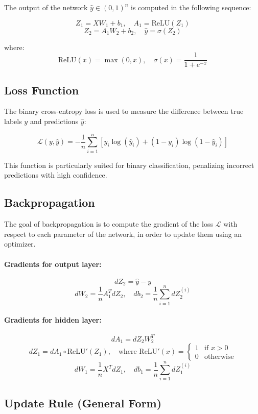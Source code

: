 \documentclass[12pt]{article}
\begin{document}
The output of the network $\hat{y} \in (0,1)^n$ is computed in the following sequence:

\[
Z_1 = X W_1 + b_1, \quad A_1 = \text{ReLU}(Z_1)
\]
\[
Z_2 = A_1 W_2 + b_2, \quad \hat{y} = \sigma(Z_2)
\]

where:
\[
\text{ReLU}(x) = \max(0, x), \quad \sigma(x) = \frac{1}{1 + e^{-x}}
\]

\subsection{Loss Function}

The binary cross-entropy loss is used to measure the difference between true labels $y$ and predictions $\hat{y}$:

\[
\mathcal{L}(y, \hat{y}) = - \frac{1}{n} \sum_{i=1}^{n} \left[ y_i \log(\hat{y}_i) + (1 - y_i) \log(1 - \hat{y}_i) \right]
\]

This function is particularly suited for binary classification, penalizing incorrect predictions with high confidence.

\subsection{Backpropagation}

The goal of backpropagation is to compute the gradient of the loss $\mathcal{L}$ with respect to each parameter of the network, in order to update them using an optimizer.

\paragraph{Gradients for output layer:}
\[
dZ_2 = \hat{y} - y
\]
\[
dW_2 = \frac{1}{n} A_1^T dZ_2, \quad db_2 = \frac{1}{n} \sum_{i=1}^{n} dZ_2^{(i)}
\]

\paragraph{Gradients for hidden layer:}
\[
dA_1 = dZ_2 W_2^T
\]
\[
dZ_1 = dA_1 \circ \text{ReLU}'(Z_1), \quad \text{where } \text{ReLU}'(x) = \begin{cases} 1 & \text{if } x > 0 \\ 0 & \text{otherwise} \end{cases}
\]
\[
dW_1 = \frac{1}{n} X^T dZ_1, \quad db_1 = \frac{1}{n} \sum_{i=1}^{n} dZ_1^{(i)}
\]

\subsection{Update Rule (General Form)}
\end{document}
